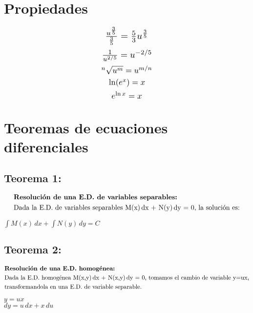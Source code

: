 \documentclass[a4paper,12pt,numbers=noenddot]{scrreprt}
\begin{document}
    \section*{Propiedades}
    \begin{multicols}{3}
        \begin{equation*}
            \scalebox{1.4}{$\frac{u^{\frac{3}{5}}}{\frac{3}{5}} = \frac{5}{3}u^{\frac{3}{5}}$}
        \end{equation*}
        \begin{equation*}
            \scalebox{1.3}{$\frac{1}{u^{2/5}} = u^{-2/5}$}
        \end{equation*}
        \begin{equation*}
            \scalebox{1.2}{$^n \sqrt{u^m} = u^{m/n}$}
        \end{equation*}    
        \begin{equation*}
            \scalebox{1.2}{$\ln(e^x) = x$}
        \end{equation*}
        \begin{equation*}
            \scalebox{1.2}{$e^{\ln x} = x$}	
        \end{equation*}
        \end{multicols}
\section*{Teoremas de ecuaciones diferenciales}
\subsection*{Teorema 1:}
\begin{align*}
    &\textbf{Resolución de una E.D. de variables separables:}\\
    &\text{Dada la E.D. de variables separables M(x)\,dx + N(y)\,dy = 0, la solución es:}
\end{align*}
\begin{center}
    \(\int M(x)\,dx + \int N(y)\,dy = C\)
\end{center}
\subsection*{Teorema 2:}
\begin{align*}
    &\textbf{Resolución de una E.D. homogénea:}\\
    &\text{Dada la E.D. homogénea M(x,y)\,dx + N(x,y)\,dy = 0, tomamos el cambio de variable y=ux,}\\ 
    &\text{transformandola en una E.D. de variable separable.}
\end{align*}
\begin{center}
    \(y=ux\)\\
    \(dy = u\,dx + x\,du\)
\end{center}
        
\end{document}
